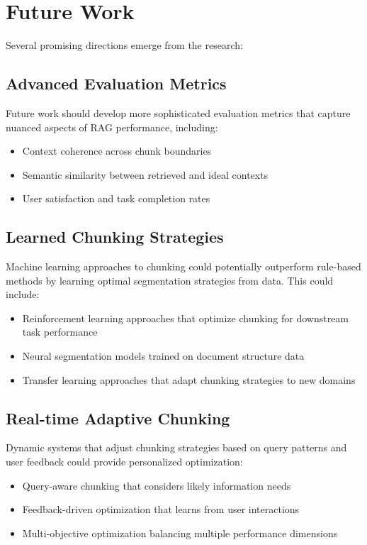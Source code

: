 \documentclass[11pt,a4paper]{article}
\begin{document}
\section{Future Work}

Several promising directions emerge from the research:

\subsection{Advanced Evaluation Metrics}

Future work should develop more sophisticated evaluation metrics that capture nuanced aspects of RAG performance, including:

\begin{itemize}
\item Context coherence across chunk boundaries
\item Semantic similarity between retrieved and ideal contexts
\item User satisfaction and task completion rates
\end{itemize}

\subsection{Learned Chunking Strategies}

Machine learning approaches to chunking could potentially outperform rule-based methods by learning optimal segmentation strategies from data. This could include:

\begin{itemize}
\item Reinforcement learning approaches that optimize chunking for downstream task performance
\item Neural segmentation models trained on document structure data
\item Transfer learning approaches that adapt chunking strategies to new domains
\end{itemize}

\subsection{Real-time Adaptive Chunking}

Dynamic systems that adjust chunking strategies based on query patterns and user feedback could provide personalized optimization:

\begin{itemize}
\item Query-aware chunking that considers likely information needs
\item Feedback-driven optimization that learns from user interactions
\item Multi-objective optimization balancing multiple performance dimensions
\end{itemize}
\end{document}
